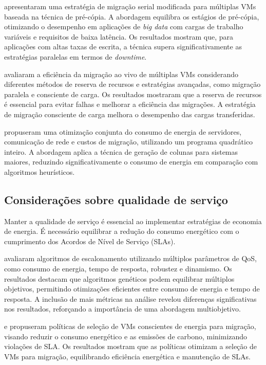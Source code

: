 \documentclass[
	12pt,				%
	oneside,			%
	a4paper,			%
	english,			%
	brazil				%
	]{abntex2ppgsi}
\begin{document}
 apresentaram uma estratégia de migração serial modificada para múltiplas VMs baseada na técnica de pré-cópia. A abordagem equilibra os estágios de pré-cópia, otimizando o desempenho em aplicações de \textit{big data} com cargas de trabalho variáveis e requisitos de baixa latência. Os resultados mostram que, para aplicações com altas taxas de escrita, a técnica supera significativamente as estratégias paralelas em termos de \textit{downtime}.

 avaliaram a eficiência da migração ao vivo de múltiplas VMs considerando diferentes métodos de reserva de recursos e estratégias avançadas, como migração paralela e consciente de carga. Os resultados mostraram que a reserva de recursos é essencial para evitar falhas e melhorar a eficiência das migrações. A estratégia de migração consciente de carga melhora o desempenho das cargas transferidas.

 propuseram uma otimização conjunta do consumo de energia de servidores, comunicação de rede e custos de migração, utilizando um programa quadrático inteiro. A abordagem aplica a técnica de geração de colunas para sistemas maiores, reduzindo significativamente o consumo de energia em comparação com algoritmos heurísticos.

\subsection{Considerações sobre qualidade de serviço}

Manter a qualidade de serviço é essencial ao implementar estratégias de economia de energia. É necessário equilibrar a redução do consumo energético com o cumprimento dos Acordos de Nível de Serviço (SLAs).

 avaliaram algoritmos de escalonamento utilizando múltiplos parâmetros de QoS, como consumo de energia, tempo de resposta, robustez e dinamismo. Os resultados destacam que algoritmos genéticos podem equilibrar múltiplos objetivos, permitindo otimizações eficientes entre consumo de energia e tempo de resposta. A inclusão de mais métricas na análise revelou diferenças significativas nos resultados, reforçando a importância de uma abordagem multiobjetivo.

 e  propuseram políticas de seleção de VMs conscientes de energia para migração, visando reduzir o consumo energético e as emissões de carbono, minimizando violações de SLA. Os resultados mostram que as políticas otimizam a seleção de VMs para migração, equilibrando eficiência energética e manutenção de SLAs.
\end{document}
